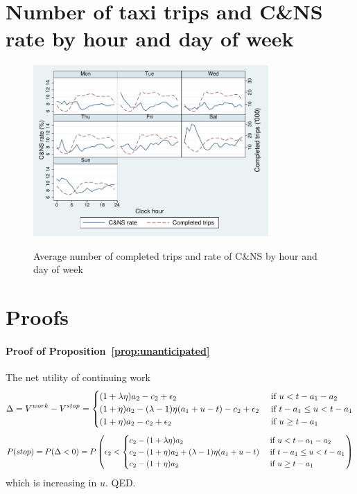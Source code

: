 \documentclass[reviewmode]{restat}
\begin{document}
\begin{appendices}
\section{Number of taxi trips and C\&NS rate by hour and day of week}
\FloatBarrier
\begin{figure}[!ht]
	\centering
	\caption{Average number of completed trips and rate of C\&NS by hour and day of week}%
	\includegraphics[width=0.8\textwidth]{./fg/dowplot.pdf}
	\label{fg:trips}
\end{figure}


\FloatBarrier

\section{Proofs}
\label{apx:proofs}
\paragraph{Proof of Proposition~\ref{prop:unanticipated}} The net utility of continuing work
\[\Delta = V^{work} - V^{stop} = \begin{cases} 
(1+\lambda\eta)a_2 - c_2 + \epsilon_2 & \hbox{ if } u < t - a_1 - a_2 \\
(1+\eta)a_2 - (\lambda-1)\eta(a_1 + u - t) - c_2 + \epsilon_2 & \hbox{ if } t-a_1 \leq u < t - a_1 \\ 
(1+\eta)a_2 - c_2 + \epsilon_2 & \hbox{ if } u \geq t - a_1
\end{cases}\]
\[P(stop) = P(\Delta < 0) = P\left(\epsilon_2 < \begin{cases} 
c_2 - (1+\lambda\eta)a_2 & \hbox{ if } u < t - a_1 - a_2 \\
c_2 - (1+\eta)a_2 + (\lambda-1)\eta(a_1 + u - t) & \hbox{ if } t-a_1 \leq u < t - a_1 \\ 
c_2 - (1+\eta)a_2 & \hbox{ if } u \geq t - a_1\\
\end{cases}\right) 
\]
which is increasing in $u$. QED.


\end{appendices}
\end{document}
